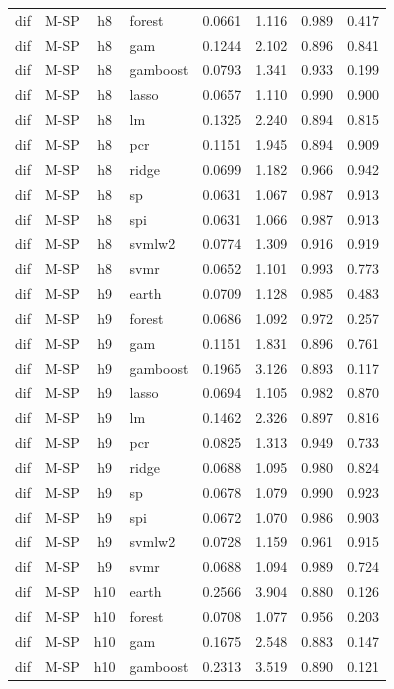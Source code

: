 \begin{ThreePartTable}
\begin{longtable}[t]{llclcccc}
dif & M-SP & h8 & forest & 0.0661 & 1.116 & 0.989 & 0.417\\
dif & M-SP & h8 & gam & 0.1244 & 2.102 & 0.896 & 0.841\\
dif & M-SP & h8 & gamboost & 0.0793 & 1.341 & 0.933 & 0.199\\
dif & M-SP & h8 & lasso & 0.0657 & 1.110 & 0.990 & 0.900\\
dif & M-SP & h8 & lm & 0.1325 & 2.240 & 0.894 & 0.815\\
dif & M-SP & h8 & pcr & 0.1151 & 1.945 & 0.894 & 0.909\\
dif & M-SP & h8 & ridge & 0.0699 & 1.182 & 0.966 & 0.942\\
dif & M-SP & h8 & sp & 0.0631 & 1.067 & 0.987 & 0.913\\
dif & M-SP & h8 & spi & 0.0631 & 1.066 & 0.987 & 0.913\\
dif & M-SP & h8 & svmlw2 & 0.0774 & 1.309 & 0.916 & 0.919\\
dif & M-SP & h8 & svmr & 0.0652 & 1.101 & 0.993 & 0.773\\
\addlinespace
dif & M-SP & h9 & earth & 0.0709 & 1.128 & 0.985 & 0.483\\
dif & M-SP & h9 & forest & 0.0686 & 1.092 & 0.972 & 0.257\\
dif & M-SP & h9 & gam & 0.1151 & 1.831 & 0.896 & 0.761\\
dif & M-SP & h9 & gamboost & 0.1965 & 3.126 & 0.893 & 0.117\\
dif & M-SP & h9 & lasso & 0.0694 & 1.105 & 0.982 & 0.870\\
dif & M-SP & h9 & lm & 0.1462 & 2.326 & 0.897 & 0.816\\
dif & M-SP & h9 & pcr & 0.0825 & 1.313 & 0.949 & 0.733\\
dif & M-SP & h9 & ridge & 0.0688 & 1.095 & 0.980 & 0.824\\
dif & M-SP & h9 & sp & 0.0678 & 1.079 & 0.990 & 0.923\\
dif & M-SP & h9 & spi & 0.0672 & 1.070 & 0.986 & 0.903\\
dif & M-SP & h9 & svmlw2 & 0.0728 & 1.159 & 0.961 & 0.915\\
dif & M-SP & h9 & svmr & 0.0688 & 1.094 & 0.989 & 0.724\\
\addlinespace
dif & M-SP & h10 & earth & 0.2566 & 3.904 & 0.880 & 0.126\\
dif & M-SP & h10 & forest & 0.0708 & 1.077 & 0.956 & 0.203\\
dif & M-SP & h10 & gam & 0.1675 & 2.548 & 0.883 & 0.147\\
dif & M-SP & h10 & gamboost & 0.2313 & 3.519 & 0.890 & 0.121\\

\end{longtable}
\end{ThreePartTable}
